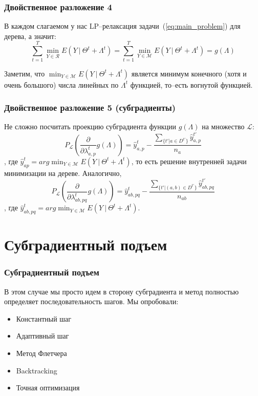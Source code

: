 \documentclass[smaller,unicode,hyperref={unicode=true}]{beamer}
\begin{document}
\begin{frame}
  \frametitle{Двойственное разложение 4}
  В каждом слагаемом у нас LP--релаксация задачи~(\ref{eq:main_problem}) для дерева, а значит:
  \begin{equation}
    \sum_{t = 1}^{T} \min_{Y \in \mathcal{R}} E(Y~|~\Theta^t + \Lambda^t) = \sum_{t = 1}^{T} \min_{Y \in \mathcal{M}} E(Y~|~\Theta^t + \Lambda^t) = g(\Lambda)
  \end{equation}

  Заметим, что $\min_{Y \in \mathcal{M}} E(Y~|~\Theta^t + \Lambda^t)$ является минимум конечного (хотя и очень большого) числа линейных по $\Lambda^t$ функцией, то--есть вогнутой функцией.

\end{frame}

\begin{frame}
  \frametitle{Двойственное разложение 5 (субградиенты)}
  Не сложно посчитать проекцию субградиента функции $g(\Lambda)$ на множество $\mathcal{L}$:\\
  \begin{equation}
    P_{\mathcal{L}} \left( \frac{\partial}{\partial \lambda_{a,p}^t} g(\Lambda) \right ) = \widehat{y}_{a,p}^t - \frac{\sum_{\{t' | a \in D^{t'}\}} \widehat{y}_{a,p}^{t'}}{n_a}
  \end{equation}
  , где $\widehat{y}_{ap}^t = arg\min_{Y \in \mathcal{M}} E(Y~|~\Theta^t + \Lambda^t)$, то есть решение внутренней задачи минимизации на дереве. Аналогично,
  \begin{equation}
    P_{\mathcal{L}} \left( \frac{\partial}{\partial \lambda_{ab,pq}^t} g(\Lambda) \right ) = \widehat{y}_{ab,pq}^t - \frac{\sum_{\{t' | (a,b) \in D^{t'}\}} \widehat{y}_{ab,pq}^{t'}}{n_{ab}}
  \end{equation}
  , где $\widehat{y}_{ab,pq}^t = arg\min_{Y \in \mathcal{M}} E(Y~|~\Theta^t + \Lambda^t)$.
\end{frame}

\section{Субградиентный подъем}
\begin{frame}
  \frametitle{Субградиентный подъем}
    В этом случае мы просто идем в сторону субградиента и метод полностью определяет последовательность шагов. Мы опробовали:
  \begin{itemize}
    \item Константный шаг
    \item Адаптивный шаг
    \item Метод Флетчера
    \item Backtracking
    \item Точная оптимизация
  \end{itemize}
\end{frame}
\end{document}
